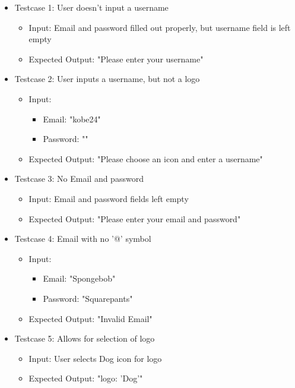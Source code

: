 \begin{itemize}
    \item Testcase 1: User doesn't input a username
    \begin{itemize}
        \item Input: Email and password filled out properly, but username field is left empty
        \item Expected Output: "Please enter your username"
    \end{itemize}

    \item Testcase 2: User inputs a username, but not a logo
    \begin{itemize}
        \item Input:
            \begin{itemize}
                \item Email: "kobe24"
                \item Password: ""
            \end{itemize}
        \item Expected Output: "Please choose an icon and enter a username"
    \end{itemize}

    \item Testcase 3: No Email and password
    \begin{itemize}
        \item Input: Email and password fields left empty
        \item Expected Output: "Please enter your email and password"
    \end{itemize}

    \item Testcase 4: Email with no '@' symbol
    \begin{itemize}
        \item Input:
            \begin{itemize}
                \item Email: "Spongebob"
                \item Password: "Squarepants"
            \end{itemize}
        \item Expected Output: "Invalid Email"
    \end{itemize}

    \item Testcase 5: Allows for selection of logo
    \begin{itemize}
        \item Input: User selects Dog icon for logo
        \item Expected Output: "logo: 'Dog'"
    \end{itemize}


\end{itemize}
